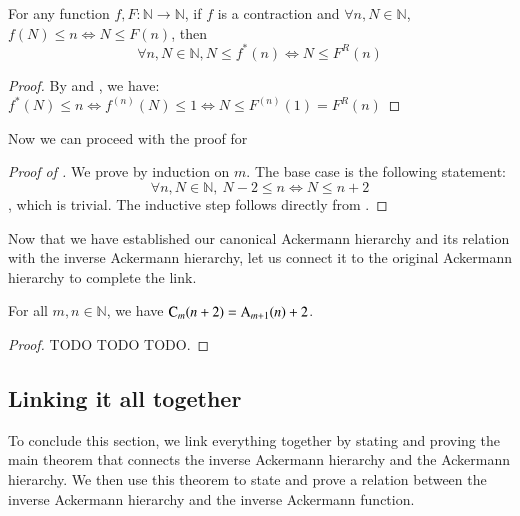\begin{lem}  \label{lem: countdown_rep_app}
For any function $f, F: \mathbb{N} \to \mathbb{N}$, 
if $f$ is a contraction and $\forall n, N\in \mathbb{N}$, 
$f(N) \le n \iff N \le F(n)$, then
$$ \forall n, N\in \mathbb{N}, N\le f^*(n) \iff N \le F^R(n) $$
\end{lem}

\begin{proof}
By  and , we have:
$\displaystyle f^*(N)\le n \iff f^{(n)}(N) \le 1 \iff N \le F^{(n)}(1) = F^R(n) $
\end{proof}

Now we can proceed with the proof for 

\begin{proof}[Proof of ]
We prove by induction on $m$. The base case is the following statement:
$$ \forall n, N\in \mathbb{N}, \ N - 2\le n \iff N \le n + 2 $$
, which is trivial. The inductive step follows directly from .
\end{proof}

Now that we have established our canonical Ackermann hierarchy 
and its relation with the inverse Ackermann hierarchy, let us 
connect it to the original Ackermann hierarchy to complete the link.

\begin{thm} \label{thm: can_ack_ack}
For all $m, n\in \mathbb{N}$, we have $\text{C}_m(n+2) = \text{A}_{m+1}(n) + 2$.
\end{thm}

\begin{proof} TODO TODO TODO.
%
%
\end{proof}

\subsection{Linking it all together}

To conclude this section, we link everything together by 
stating and proving the main theorem that connects the 
inverse Ackermann hierarchy and the Ackermann hierarchy. 
We then use this theorem to state and prove a relation 
between the inverse Ackermann hierarchy and the inverse 
Ackermann function.

